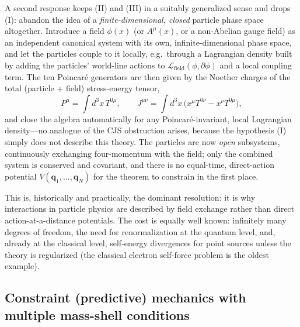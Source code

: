 \documentclass[11pt]{article}
\newcommand{\bq}{\mathbf{q}}
\begin{document}
A second response keeps (II) and (III) in a suitably generalized sense and drops (I): abandon the idea of a \emph{finite-dimensional, closed} particle phase space altogether. Introduce a field $\phi(x)$ (or $A^\mu(x)$, or a non-Abelian gauge field) as an independent canonical system with its own, infinite-dimensional phase space, and let the particles couple to it locally, e.g.\ through a Lagrangian density built by adding the particles' world-line actions to $\mathcal L_{\text{field}}(\phi,\partial\phi)$ and a local coupling term. The ten Poincar\'e generators are then given by the Noether charges of the total (particle + field) stress-energy tensor,
\begin{equation}
P^\mu=\int d^3x\, T^{0\mu}, \qquad J^{\mu\nu}=\int d^3x\,\big(x^\mu T^{0\nu}-x^\nu T^{0\mu}\big),
\end{equation}
and close the algebra automatically for any Poincar\'e-invariant, local Lagrangian density---no analogue of the CJS obstruction arises, because the hypothesis (I) simply does not describe this theory. The particles are now \emph{open} subsystems, continuously exchanging four-momentum with the field; only the combined system is conserved and covariant, and there is no equal-time, direct-action potential $V(\bq_1,\dots,\bq_N)$ for the theorem to constrain in the first place.

This is, historically and practically, the dominant resolution: it is why interactions in particle physics are described by field exchange rather than direct action-at-a-distance potentials. The cost is equally well known: infinitely many degrees of freedom, the need for renormalization at the quantum level, and, already at the classical level, self-energy divergences for point sources unless the theory is regularized (the classical electron self-force problem is the oldest example).

\subsection{Constraint (predictive) mechanics with multiple mass-shell conditions}
\label{sec:constraint}
\end{document}
